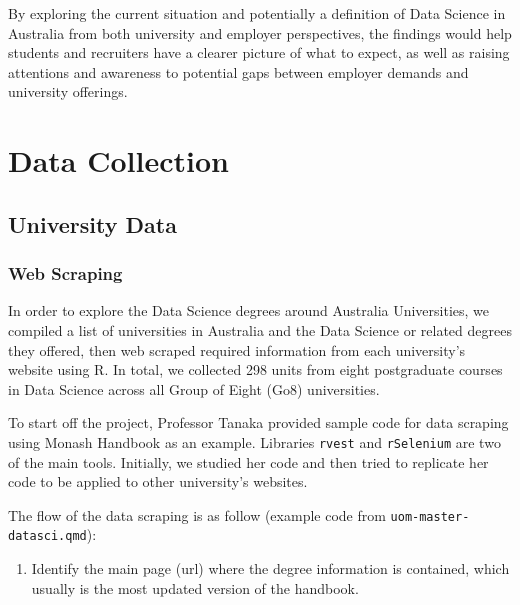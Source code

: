 \documentclass[
  letterpaper,
  DIV=11,
  numbers=noendperiod]{scrreport}
\newenvironment{Shaded}{\begin{snugshade}}{\end{snugshade}}
\newcommand{\DecValTok}[1]{\textcolor[rgb]{0.68,0.00,0.00}{#1}}
\newcommand{\FunctionTok}[1]{\textcolor[rgb]{0.28,0.35,0.67}{#1}}
\newcommand{\NormalTok}[1]{\textcolor[rgb]{0.00,0.23,0.31}{#1}}
\newcommand{\OtherTok}[1]{\textcolor[rgb]{0.00,0.23,0.31}{#1}}
\newcommand{\SpecialCharTok}[1]{\textcolor[rgb]{0.37,0.37,0.37}{#1}}
\newcommand{\StringTok}[1]{\textcolor[rgb]{0.13,0.47,0.30}{#1}}
\providecommand{\tightlist}{%
  \setlength{\itemsep}{0pt}\setlength{\parskip}{0pt}}\usepackage{longtable,booktabs,array}
\begin{document}
By exploring the current situation and potentially a definition of Data
Science in Australia from both university and employer perspectives, the
findings would help students and recruiters have a clearer picture of
what to expect, as well as raising attentions and awareness to potential
gaps between employer demands and university offerings.

\part{Data Collection}

\hypertarget{university-data}{%
\chapter{University Data}\label{university-data}}

\hypertarget{web-scraping}{%
\section{Web Scraping}\label{web-scraping}}

In order to explore the Data Science degrees around Australia
Universities, we compiled a list of universities in Australia and the
Data Science or related degrees they offered, then web scraped required
information from each university's website using R. In total, we
collected 298 units from eight postgraduate courses in Data Science
across all Group of Eight (Go8) universities.

To start off the project, Professor Tanaka provided sample code for data
scraping using Monash Handbook as an example. Libraries \texttt{rvest}
and \texttt{rSelenium} are two of the main tools. Initially, we studied
her code and then tried to replicate her code to be applied to other
university's websites.

The flow of the data scraping is as follow (example code from
\texttt{uom-master-datasci.qmd}):

\begin{enumerate}
\def\labelenumi{\arabic{enumi}.}
\tightlist
\item
  Identify the main page (url) where the degree information is
  contained, which usually is the most updated version of the handbook.
\end{enumerate}

\begin{Shaded}
\end{Shaded}
\end{document}

